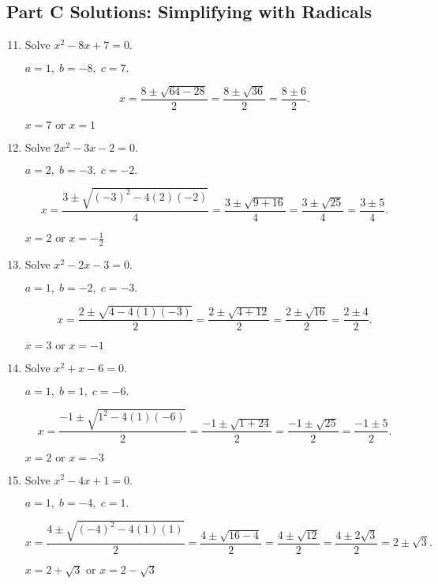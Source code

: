 \documentclass[12pt]{article}
\begin{document}
\subsection*{Part C Solutions: Simplifying with Radicals}
\begin{enumerate}
  \setcounter{enumi}{10}
  \item Solve \(x^2 - 8x + 7 = 0.\)

  \(a = 1,\; b = -8,\; c = 7.\)

  \[
  x = \frac{8 \pm \sqrt{64 - 28}}{2}
  = \frac{8 \pm \sqrt{36}}{2}
  = \frac{8 \pm 6}{2}.
  \]

  \(\boxed{x = 7 \text{ or } x = 1}\)

  \item Solve \(2x^2 - 3x - 2 = 0.\)

  \(a = 2,\; b = -3,\; c = -2.\)

  \[
  x = \frac{3 \pm \sqrt{(-3)^2 - 4(2)(-2)}}{4}
  = \frac{3 \pm \sqrt{9 + 16}}{4}
  = \frac{3 \pm \sqrt{25}}{4}
  = \frac{3 \pm 5}{4}.
  \]

  \(\boxed{x = 2 \text{ or } x = -\tfrac{1}{2}}\)

  \item Solve \(x^2 - 2x - 3 = 0.\)

  \(a = 1,\; b = -2,\; c = -3.\)

  \[
  x = \frac{2 \pm \sqrt{4 - 4(1)(-3)}}{2}
  = \frac{2 \pm \sqrt{4 + 12}}{2}
  = \frac{2 \pm \sqrt{16}}{2}
  = \frac{2 \pm 4}{2}.
  \]

  \(\boxed{x = 3 \text{ or } x = -1}\)

  \item Solve \(x^2 + x - 6 = 0.\)

  \(a = 1,\; b = 1,\; c = -6.\)

  \[
  x = \frac{-1 \pm \sqrt{1^2 - 4(1)(-6)}}{2}
  = \frac{-1 \pm \sqrt{1 + 24}}{2}
  = \frac{-1 \pm \sqrt{25}}{2}
  = \frac{-1 \pm 5}{2}.
  \]

  \(\boxed{x = 2 \text{ or } x = -3}\)

  \item Solve \(x^2 - 4x + 1 = 0.\)

  \(a = 1,\; b = -4,\; c = 1.\)

  \[
  x = \frac{4 \pm \sqrt{(-4)^2 - 4(1)(1)}}{2}
  = \frac{4 \pm \sqrt{16 - 4}}{2}
  = \frac{4 \pm \sqrt{12}}{2}
  = \frac{4 \pm 2\sqrt{3}}{2}
  = 2 \pm \sqrt{3}.
  \]

  \(\boxed{x = 2 + \sqrt{3} \text{ or } x = 2 - \sqrt{3}}\)
\end{enumerate}
\end{document}
